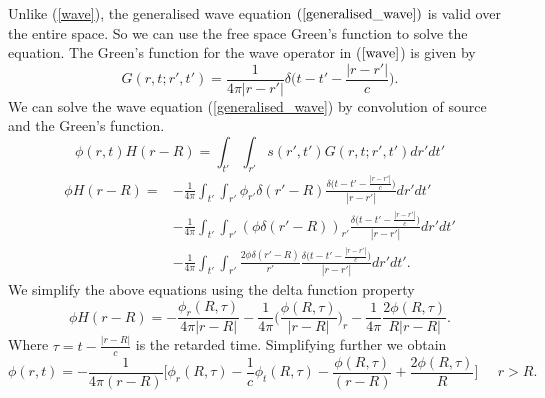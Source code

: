\documentclass[a4paper]{article}
\begin{document}
Unlike (\ref{wave}), the generalised wave equation $(\ref{generalised_wave})$ is valid over the entire space. So we can use the free space Green's function to solve the equation. The Green's function for the wave operator in ($\ref{wave}$) is given by
\begin{equation}
    G(r, t; r', t') = \frac{1}{4\pi |r - r'|}\delta \Big(t - t' - \frac{|r - r'|}{c}\Big). 
\end{equation}
We can solve the wave equation (\ref{generalised_wave}) by convolution of source and the Green's function.
\begin{equation}
    \phi(r, t) H(r - R) = \int_{t'}\int_{r'}s(r', t')G(r, t; r', t')dr'dt'
\end{equation}
\begin{equation}
    \begin{split}
        \phi H(r - R) = &-\frac{1}{4\pi}\int_{t'}\int_{r'} \phi_{r'}\delta(r' - R) \frac{\delta \Big(t - t' - \frac{|r - r'|}{c}\Big)}{|r - r'|} dr'dt'\\
                        &-\frac{1}{4\pi}\int_{t'}\int_{r'} (\phi \delta (r' - R))_{r'} \frac{\delta \Big(t - t' - \frac{|r - r'|}{c}\Big)}{ |r - r'| }dr'dt'\\
                        &-\frac{1}{4\pi}\int_{t'}\int_{r'} \frac{2\phi \delta(r' - R)}{r'}\frac{\delta \Big(t - t' - \frac{|r - r'|}{c}\Big)}{ |r - r'| }dr'dt'.
    \end{split}
\end{equation}
We simplify the above equations using the delta function property
\begin{equation}
    \phi H(r - R) = -\frac{\phi_{r}(R, \tau)}{4\pi  |r - R|} - \frac{1}{4\pi}\Big(\frac{\phi (R, \tau)}{|r - R|}\Big)_r   - \frac{1}{4\pi} \frac{2\phi(R, \tau)}{R |r - R|}.
\end{equation}
Where $\tau = t - \frac{|r - R|}{c}$ is the retarded time. Simplifying further we obtain
\begin{equation}
    \phi(r, t) = -\frac{1}{4\pi (r - R)}\Big[ \phi_{r}(R, \tau) - \frac{1}{c}\phi_t (R, \tau) - \frac{\phi(R, \tau)}{(r - R)}  + \frac{2 \phi(R, \tau)}{R} \Big] \;\;\;\;\; r > R.
\end{equation}
\end{document}
